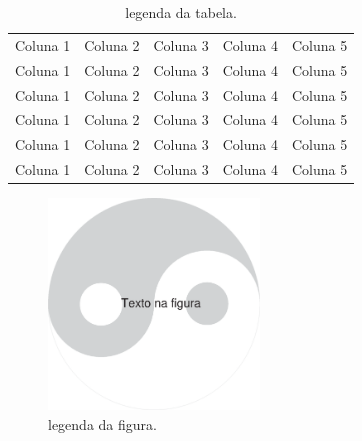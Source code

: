 \documentclass[a4paper,12pt]{article}
\begin{document}

	\lipsum[1-3]

	\begin{table}
		\centering
		\begin{tabular}{ccccc}
		Coluna 1 & Coluna 2 & Coluna 3 & Coluna 4 & Coluna 5 \\
		Coluna 1 & Coluna 2 & Coluna 3 & Coluna 4 & Coluna 5 \\
		Coluna 1 & Coluna 2 & Coluna 3 & Coluna 4 & Coluna 5 \\
		Coluna 1 & Coluna 2 & Coluna 3 & Coluna 4 & Coluna 5 \\
		Coluna 1 & Coluna 2 & Coluna 3 & Coluna 4 & Coluna 5 \\
		Coluna 1 & Coluna 2 & Coluna 3 & Coluna 4 & Coluna 5 \\
		\end{tabular}
		\caption{legenda da tabela.}
	\end{table}
	
	\lipsum[4-7]
	
	\begin{figure}
		\centering
		\includegraphics[width=0.5\textwidth]{Tei-Gi}
		\caption{legenda da figura.}
	\end{figure}
	
\end{document}
